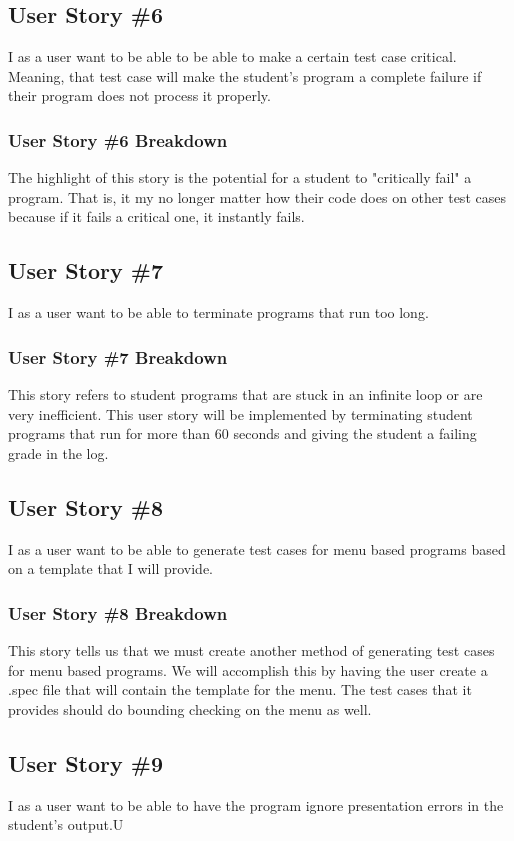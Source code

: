 \subsection{User Story \#6}
I as a user want to be able to be able to make a certain test case critical. Meaning, that test case will make the student's program a complete failure if their program does not process it properly.

\subsubsection{User Story \#6 Breakdown}
The highlight of this story is the potential for a student to "critically fail" a program. That is, it my no longer matter how their code does on other test cases because if it fails a critical one, it instantly fails.

\subsection{User Story \#7}
I as a user want to be able to terminate programs that run too long.

\subsubsection{User Story \#7 Breakdown}
This story refers to student programs that are stuck in an infinite loop or are very inefficient. This user story will be implemented by terminating student programs that run for more than 60 seconds and giving the student a failing grade in the log.

\subsection{User Story \#8}
I as a user want to be able to generate test cases for menu based programs based on a template that I will provide.

\subsubsection{User Story \#8 Breakdown}
This story tells us that we must create another method of generating test cases for menu based programs. We will accomplish this by having the user create a .spec file that will contain the template for the menu. The test cases that it provides should do bounding checking on the menu as well.

\subsection{User Story \#9}
I as a user want to be able to have the program ignore presentation errors in the student's output.U

